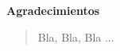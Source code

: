 \newpage{\pagestyle{empty}\cleardoublepage}

\begin{center}
\textbf{\large{}Agradecimientos}
\par\end{center}{\large \par}
\begin{quote}
Bla, Bla, Bla ...\end{quote}

